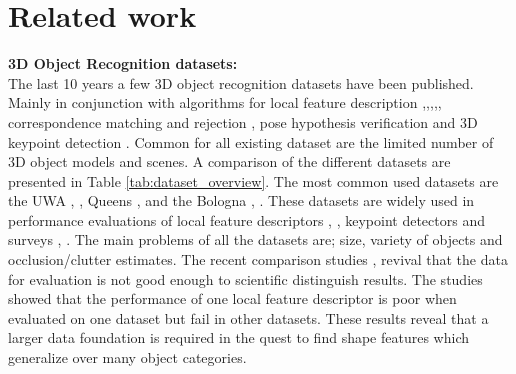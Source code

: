 \documentclass[10pt,twocolumn,letterpaper]{article}
\begin{document}
\section{Related work}\label{sec:related_work}
\noindent
\textbf{3D Object Recognition datasets:}\\
The last 10 years a few 3D object recognition datasets have been published. Mainly in conjunction with algorithms for local feature description \cite{Mian2006},\cite{Taati2007},\cite{Taati2011},\cite{Tombari2010},\cite{Salti2014}, correspondence matching and rejection \cite{Rodola2013}, pose hypothesis verification \cite{Aldoma2012} and 3D keypoint detection \cite{Mian2010}. Common for all existing dataset are the limited number of 3D object models and scenes. A comparison of the different datasets are presented in Table \ref{tab:dataset_overview}. The most common used datasets are the UWA  \cite{Mian2006}, \cite{Mian2010}, Queens \cite{Taati2007},\cite{Taati2011} and the Bologna \cite{Salti2014}, \cite{Tombari2010}. These datasets are widely used in performance evaluations of  local feature descriptors \cite{Guo2015}, \cite{Buch2016}, keypoint detectors \cite{Salti2011} and surveys \cite{Guo2014}, \cite{FilipeAlexandre2014}. The main problems of all the datasets are; size, variety of objects and occlusion/clutter estimates. The recent comparison studies \cite{Buch2016},\cite{Guo2015} revival that the data for evaluation is not good enough to scientific distinguish results. The studies showed that the performance of one local feature descriptor is poor when evaluated on one dataset but fail in other datasets. These results reveal that a larger data foundation is required in the quest to find shape features which generalize over many object categories.\\ 
\end{document}
